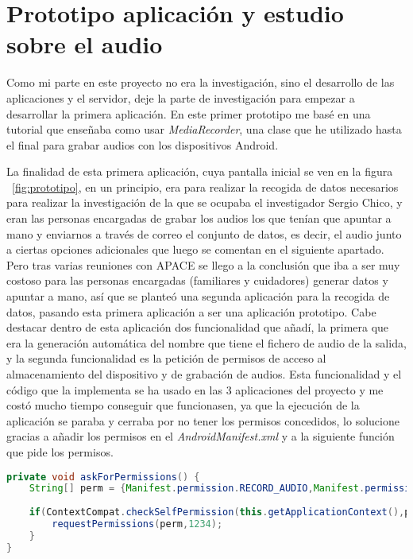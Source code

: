 \section{Prototipo aplicación y estudio sobre el audio}
Como mi parte en este proyecto no era la investigación, sino el desarrollo de las aplicaciones y el servidor, deje la parte de investigación para empezar a desarrollar la primera aplicación. En este primer prototipo me basé en una tutorial que enseñaba como usar \textit{MediaRecorder}, una clase que he utilizado hasta el final para grabar audios con los dispositivos Android.

La finalidad de esta primera aplicación, cuya pantalla inicial se ven en la figura ~\ref{fig:prototipo}, en un principio, era para realizar la recogida de datos necesarios para realizar la investigación de la que se ocupaba el investigador Sergio Chico, y eran las personas encargadas de grabar los audios los que tenían que apuntar a mano y enviarnos a través de correo el conjunto de datos, es decir, el audio junto a ciertas opciones adicionales que luego se comentan en el siguiente apartado. Pero tras varias reuniones con APACE se llego a la conclusión que iba a ser muy costoso para las personas encargadas (familiares y cuidadores) generar datos y apuntar a mano, así que se planteó  una segunda aplicación para la recogida de datos, pasando esta primera aplicación a ser una aplicación prototipo. Cabe destacar dentro de esta aplicación dos funcionalidad que añadí, la primera que era la generación automática del nombre que tiene el fichero de audio de la salida, y la segunda funcionalidad es la petición de permisos de acceso al almacenamiento del dispositivo y de grabación de audios. Esta funcionalidad y el código que la implementa se ha usado en las 3 aplicaciones del proyecto y me costó mucho tiempo conseguir que funcionasen, ya que la ejecución de la aplicación se paraba y cerraba por no tener los permisos concedidos, lo solucione gracias a añadir los permisos en el \textit{AndroidManifest.xml} y a la siguiente función que pide los permisos.

\begin{lstlisting}[language={Java}]
private void askForPermissions() {
	String[] perm = {Manifest.permission.RECORD_AUDIO,Manifest.permission.WRITE_EXTERNAL_STORAGE};
	
	if(ContextCompat.checkSelfPermission(this.getApplicationContext(),perm[0]) != PackageManager.PERMISSION_GRANTED || ContextCompat.checkSelfPermission(this.getApplicationContext(),perm[1]) != PackageManager.PERMISSION_GRANTED){
		requestPermissions(perm,1234);
	}
}	
\end{lstlisting}

